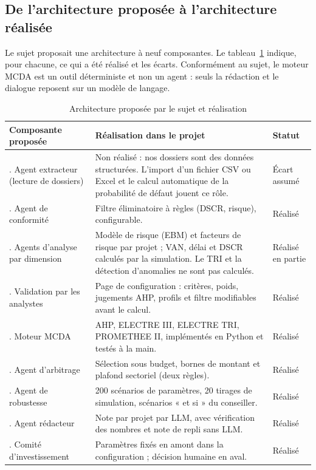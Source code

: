 \subsection{De l'architecture proposée à l'architecture réalisée}

Le sujet proposait une architecture à neuf composantes. Le tableau~\ref{tab:archi} indique, pour chacune, ce qui a
été réalisé et les écarts. Conformément au sujet, le moteur MCDA est un outil déterministe et non un agent : seuls
la rédaction et le dialogue reposent sur un modèle de langage.

\begin{table}[htbp]
\centering\footnotesize
\caption{Architecture proposée par le sujet et réalisation}\label{tab:archi}
\begin{tabularx}{\textwidth}{>{\raggedright\arraybackslash}p{3.4cm}X>{\raggedright\arraybackslash}p{2.1cm}}
\toprule
Composante proposée & Réalisation dans le projet & Statut \\
\midrule
1. Agent extracteur (lecture de dossiers) & Non réalisé : nos dossiers sont des données structurées. L'import d'un
fichier CSV ou Excel et le calcul automatique de la probabilité de défaut jouent ce rôle. & Écart assumé \\
2. Agent de conformité & Filtre éliminatoire à règles (DSCR, risque), configurable. & Réalisé \\
3. Agents d'analyse par dimension & Modèle de risque (EBM) et facteurs de risque par projet ; VAN, délai et DSCR
calculés par la simulation. Le TRI et la détection d'anomalies ne sont pas calculés. & Réalisé en partie \\
4. Validation par les analystes & Page de configuration : critères, poids, jugements AHP, profils et filtre
modifiables avant le calcul. & Réalisé \\
5. Moteur MCDA & AHP, ELECTRE III, ELECTRE TRI, PROMETHEE II, implémentés en Python et testés à la main. & Réalisé \\
6. Agent d'arbitrage & Sélection sous budget, bornes de montant et plafond sectoriel (deux règles). & Réalisé \\
7. Agent de robustesse & 200 scénarios de paramètres, 20 tirages de simulation, scénarios « et si » du conseiller. &
Réalisé \\
8. Agent rédacteur & Note par projet par LLM, avec vérification des nombres et note de repli sans LLM. & Réalisé \\
9. Comité d'investissement & Paramètres fixés en amont dans la configuration ; décision humaine en aval. & Réalisé \\
\bottomrule
\end{tabularx}
\end{table}

